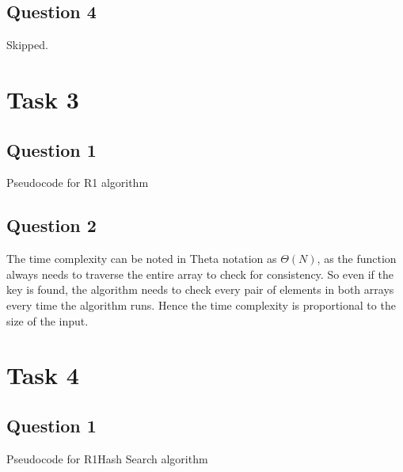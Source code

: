 \subsection{Question 4}
Skipped.

\section{Task 3}
\subsection{Question 1}

\begin{algorithm}[H]
    \caption{Pseudocode for R1 algorithm}\label{alg:R1}
    \begin{algorithmic}
        \EndIf{}
        \EndIf{}
        \EndFor{}
        \EndFunction{}
    \end{algorithmic}
\end{algorithm}

\subsection{Question 2}
The time complexity can be noted in Theta notation as $\Theta(N)$, as the function always needs to traverse the entire array to check for consistency. So even if the key is found, the algorithm needs to check every pair of elements in both arrays every time the algorithm runs. Hence the time complexity is proportional to the size of the input.

\section{Task 4}

\subsection{Question 1}

\begin{algorithm}[H]
    \caption{Pseudocode for R1Hash Search algorithm}\label{alg:R1search}
    \begin{algorithmic}
        \EndIf{}
        \EndFunction{}
    \end{algorithmic}
\end{algorithm}

